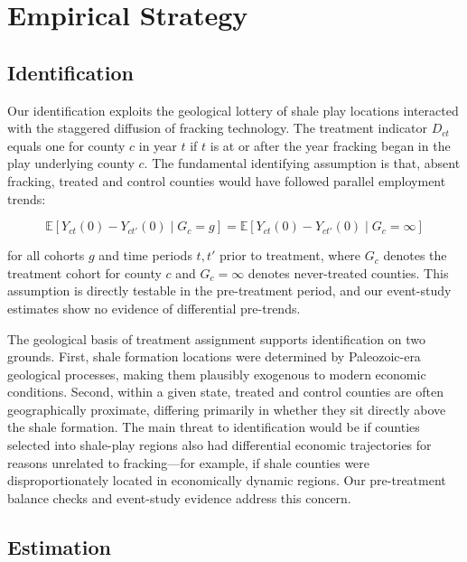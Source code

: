 \documentclass[12pt]{article}
\newcommand{\E}{\mathbb{E}}
\begin{document}



\section{Empirical Strategy}
\label{sec:strategy}

\subsection{Identification}

Our identification exploits the geological lottery of shale play locations interacted with the staggered diffusion of fracking technology. The treatment indicator $D_{ct}$ equals one for county $c$ in year $t$ if $t$ is at or after the year fracking began in the play underlying county $c$. The fundamental identifying assumption is that, absent fracking, treated and control counties would have followed parallel employment trends:

\begin{equation}
\E[Y_{ct}(0) - Y_{ct'}(0) \mid G_c = g] = \E[Y_{ct}(0) - Y_{ct'}(0) \mid G_c = \infty]
\label{eq:pt}
\end{equation}

\noindent for all cohorts $g$ and time periods $t, t'$ prior to treatment, where $G_c$ denotes the treatment cohort for county $c$ and $G_c = \infty$ denotes never-treated counties. This assumption is directly testable in the pre-treatment period, and our event-study estimates show no evidence of differential pre-trends.

The geological basis of treatment assignment supports identification on two grounds. First, shale formation locations were determined by Paleozoic-era geological processes, making them plausibly exogenous to modern economic conditions. Second, within a given state, treated and control counties are often geographically proximate, differing primarily in whether they sit directly above the shale formation. The main threat to identification would be if counties selected into shale-play regions also had differential economic trajectories for reasons unrelated to fracking---for example, if shale counties were disproportionately located in economically dynamic regions. Our pre-treatment balance checks and event-study evidence address this concern.

\subsection{Estimation}
\end{document}
